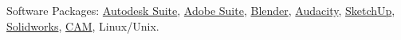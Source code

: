   \inlineheadsection
  {Software Packages:}
  {\href{http://www.autodesk.com/}{Autodesk Suite},
   \href{http://www.adobe.com/}{Adobe Suite},
   \href{http://www.blender.org/}{Blender},
   \href{http://audacity.sourceforge.net/}{Audacity},
   \href{http://www.sketchup.com/}{SketchUp},
   \href{http://www.solidworks.com/}{Solidworks},
   \href{http://en.wikipedia.org/wiki/Computer-aided_manufacturing}{CAM},
   Linux/Unix.}

\vspace{0.3em}